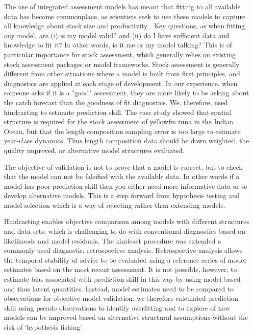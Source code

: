 \documentclass[12pt,halfline,a4paper,nonumbib]{ouparticle}
\begin{document}
The use of integrated assessment models has meant that fitting to all available data has become commonplace, as scientists seek to use these models to capture all knowledge about stock size and productivity \parencite{hilborn2003state}. Key questions, as when fitting any model, are (i) is my model valid? and (ii) do I have sufficient data and knowledge to fit it? In other words, is it me or my model talking? This is of particular importance for stock assessment, which generally relies on existing stock assessment packages or model frameworks. Stock assessment is generally different from other situations where a model is built from first principles, and diagnostics are applied at each stage of development. In our experience, when someone asks if it is a "good" assessment, they are more likely to be asking about the catch forecast than the goodness of fit diagnostics. We, therefore, used hindcasting to estimate prediction skill. The case study showed that spatial structure is required for the stock assessment of yellowfin tuna in the Indian Ocean, but that the length composition sampling error is too large to estimate year-class dynamics. Thus length composition data should be down weighted, the quality improved,  or alternative model structures evaluated.
 
The objective of validation is not to prove that a model is correct, but to check that the model can not be falsified with the available data. In other words if a model has poor prediction skill then you either need more informative data or to develop alternative models. This is a step forward from hypothesis testing and model selection which  is a way of rejecting rather than extending models. 

Hindcasting enables objective comparison among models with different structures and data sets, which is challenging to do with conventional diagnostics based on likelihoods and model residuals. The hindcast procedure was extended a commonly used diagnostic, retrospective analysis. Retrospective analysis allows the temporal stability of advice to be evaluated using a reference series of model estimates based on the most recent assessment. It is not possible, however, to estimate bias associated with prediction skill in this way by using model-based and thus latent quantities. Instead, model estimates need to be compared to observations for objective model validation. we therefore calculated prediction skill using pseudo observations to identify overfitting and to explore of how models can be improved based on alternative structural assumptions without the risk of ‘hypothesis fishing’. 
\end{document}
